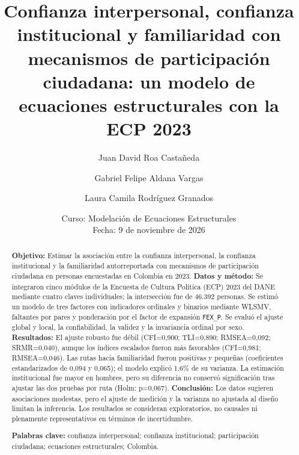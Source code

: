 \documentclass[11pt,letterpaper]{article}
\title{\textbf{Confianza interpersonal, confianza institucional y familiaridad con mecanismos de participación ciudadana: un modelo de ecuaciones estructurales con la ECP 2023}}
\author[1]{Juan David Roa Castañeda}
\author[1]{Gabriel Felipe Aldana Vargas}
\author[1]{Laura Camila Rodríguez Granados}
\affil[1]{Facultad de Estadística, Universidad Santo Tomás, Bogotá, Colombia}
\date{Curso: Modelación de Ecuaciones Estructurales\\Fecha: 9 de noviembre de 2026}
\newcommand{\palabrasclave}[1]{\par\medskip\noindent\textbf{Palabras clave:} #1}
\begin{document}
\maketitle

\begin{abstract}
\noindent\textbf{Objetivo:} Estimar la asociación entre la confianza interpersonal, la confianza institucional y la familiaridad autorreportada con mecanismos de participación ciudadana en personas encuestadas en Colombia en 2023. \textbf{Datos y método:} Se integraron cinco módulos de la Encuesta de Cultura Política (ECP) 2023 del DANE mediante cuatro claves individuales; la intersección fue de 46.392 personas. Se estimó un modelo de tres factores con indicadores ordinales y binarios mediante WLSMV, faltantes por pares y ponderación por el factor de expansión \texttt{FEX\_P}. Se evaluó el ajuste global y local, la confiabilidad, la validez y la invariancia ordinal por sexo. \textbf{Resultados:} El ajuste robusto fue débil (CFI=0{,}900; TLI=0{,}890; RMSEA=0{,}092; SRMR=0{,}040), aunque los índices escalados fueron más favorables (CFI=0{,}981; RMSEA=0{,}046). Las rutas hacia familiaridad fueron positivas y pequeñas (coeficientes estandarizados de 0{,}094 y 0{,}065); el modelo explicó 1,6\% de su varianza. La estimación institucional fue mayor en hombres, pero su diferencia no conservó significación tras ajustar las dos pruebas por ruta (Holm: p=0{,}067). \textbf{Conclusión:} Los datos sugieren asociaciones modestas, pero el ajuste de medición y la varianza no ajustada al diseño limitan la inferencia. Los resultados se consideran exploratorios, no causales ni plenamente representativos en términos de incertidumbre.

\palabrasclave{confianza interpersonal; confianza institucional; participación ciudadana; ecuaciones estructurales; Colombia.}
\end{abstract}
\end{document}
